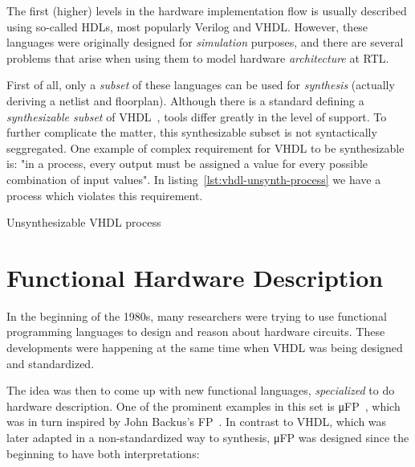         The first (higher) levels in the hardware implementation flow is usually described using
        so-called \acp{HDL}, most popularly Verilog and \acs{VHDL}.
        However, these languages were originally designed for \emph{simulation} purposes,
        and there are several problems that arise when using them to model hardware
        \emph{architecture} at \ac{RTL}.

        First of all, only a \emph{subset} of these languages can be used for \emph{synthesis}
        (actually deriving a netlist and floorplan).
        Although there is a standard defining a \emph{synthesizable subset} of \acs{VHDL}~\cite{ieee1076-3-synth-vhdl},
        tools differ greatly in the level of support.
        To further complicate the matter, this synthesizable subset is not syntactically seggregated.
        One example of complex requirement for \acs{VHDL} to be synthesizable is:
        "in a process, every output must be assigned a value for every possible combination of input values".
        In listing~\ref{lst:vhdl-unsynth-process} we have a process which violates this requirement.

        \begin{listing}[h]
            \begin{center}
            \end{center}
            \caption{Unsynthesizable \acs{VHDL} process \label{lst:vhdl-unsynth-process}}
        \end{listing}



    \section{Functional Hardware Description}
    \label{sec:functional-hardware}
        In the beginning of the 1980s, many researchers were trying to use functional programming languages
        to design and reason about hardware circuits.
        These developments were happening at the same time when \ac{VHDL} was being designed and standardized.

        The idea was then to come up with new functional languages, \emph{specialized} to do hardware description.
        One of the prominent examples in this set is μFP~\cite{mufp-1984},
        which was in turn inspired by John Backus's FP~\cite{backus-turing-lecture}.
        In contrast to \ac{VHDL}, which was later adapted in a non-standardized way to synthesis,
        μFP was designed since the beginning to have both interpretations:

